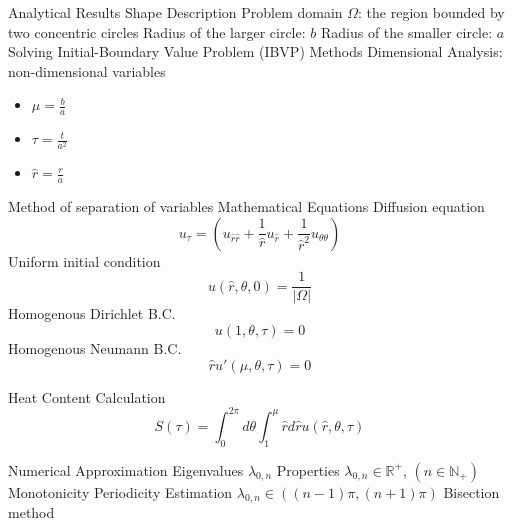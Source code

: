 \begin{outline}[enumerate]

  

\1 Analytical Results
    \2 Shape Description
      \3 Problem domain $\Omega$: the region bounded by two concentric circles
      \3 Radius of the larger circle: $b$
      \3 Radius of the smaller circle: $a$
    \2 Solving Initial-Boundary Value Problem (IBVP)
      \3 Methods
        \4 Dimensional Analysis: non-dimensional variables
          \begin{itemize}
            \item $\mu = \frac{b}{a}$
            \item $\tau = \frac{t}{a^2}$
            \item $\hat r = \frac{r}{a}$
          \end{itemize}
        \4 Method of separation of variables
     \3 Mathematical Equations
       \4 Diffusion equation
       \begin{equation}\label{eq:DA_polar_diffusion}
         u_\tau = (u_{\hat r \hat r} + \frac{1}{\hat r} u_{\hat r} + \frac{1}{\hat r ^2} u_{\theta\theta})
       \end{equation}
       \4 Uniform initial condition
       \begin{equation}\label{eq:DA_initial_bc}
         u(\hat r, \theta, 0) = \frac{1}{|\Omega|}
       \end{equation}
       \4 Homogenous Dirichlet B.C.
       \begin{equation}\label{eq:DA_Dirichlet_bc}
         u(1, \theta, \tau) = 0
       \end{equation}
       \4 Homogenous Neumann B.C.
       \begin{equation}\label{eq:DA_Neumann_bc}
         \hat r u'(\mu, \theta, \tau) = 0
       \end{equation}
       
    \2 Heat Content Calculation
      \begin{equation}\label{eq:heat_content_annulus}
        S(\tau) = \int_{0}^{2\pi} d\theta \int_{1}^{\mu} \hat r d \hat r u(\hat r, \theta, \tau)
      \end{equation}
    
  \1 Numerical Approximation
    \2 Eigenvalues $\lambda_{0, n}$
      \3 Properties
        \4 $\lambda_{0, n} \in \mathbb{R^{+}}$, $(n \in \mathbb{N}_{+})$
        \4 Monotonicity 
        \4 Periodicity
      \3 Estimation
        \4 $\lambda_{0, n} \in ((n-1) \pi, (n+1) \pi)$ \cite{NIST:DLMF}
        \4 Bisection method \cite{2020SciPy-NMeth}


\end{outline}
